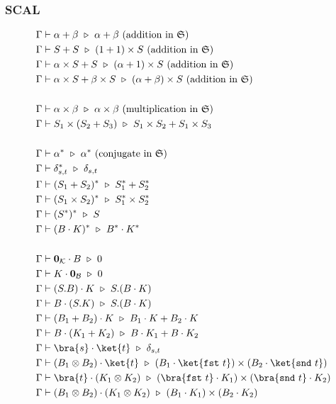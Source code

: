\subsubsection*{\textsf{SCAL}}
\begin{align*}
  & \Gamma \vdash \alpha + \beta \reduce \alpha + \beta\ \textrm{(addition in $\mathfrak{S}$)} \\
  & \Gamma \vdash S + S \reduce (1 + 1) \times S \ \textrm{(addition in $\mathfrak{S}$)} \\
  & \Gamma \vdash \alpha \times S + S \reduce (\alpha + 1) \times S\ \textrm{(addition in $\mathfrak{S}$)} \\
  & \Gamma \vdash \alpha \times S + \beta \times S \reduce (\alpha + \beta) \times S \ \textrm{(addition in $\mathfrak{S}$)} \\
  \\
  & \Gamma \vdash \alpha \times \beta \reduce \alpha \times \beta\ \textrm{(multiplication in $\mathfrak{S}$)} \\
  & \Gamma \vdash S_1 \times (S_2 + S_3) \reduce S_1 \times S_2 + S_1 \times S_3\\
  \\
  & \Gamma \vdash \alpha^* \reduce \alpha^*\ \textrm{(conjugate in $\mathfrak{S}$)} \\
  & \Gamma \vdash \delta_{s, t}^* \reduce \delta_{s, t} \\
  & \Gamma \vdash (S_1 + S_2)^* \reduce S_1^* + S_2^* \\
  & \Gamma \vdash (S_1 \times S_2)^* \reduce S_1^* \times S_2^* \\
  & \Gamma \vdash (S^*)^* \reduce S \\
  & \Gamma \vdash (B \cdot K)^* \reduce B^* \cdot K^* \\
  \\
  & \Gamma \vdash \mathbf{0}_\mathcal{K} \cdot B \reduce 0 \\
  & \Gamma \vdash K \cdot \mathbf{0}_\mathcal{B} \reduce 0 \\
  & \Gamma \vdash (S.B) \cdot K \reduce S.(B \cdot K) \\
  & \Gamma \vdash B \cdot (S.K) \reduce S.(B \cdot K) \\
  & \Gamma \vdash (B_1 + B_2) \cdot K \reduce B_1 \cdot K + B_2 \cdot K \\
  & \Gamma \vdash B \cdot (K_1 + K_2) \reduce B \cdot K_1 + B \cdot K_2 \\
  & \Gamma \vdash \bra{s} \cdot \ket{t} \reduce \delta_{s, t} \\
  & \Gamma \vdash (B_1 \otimes B_2) \cdot \ket{t} \reduce (B_1 \cdot \ket{\fst\ t}) \times (B_2 \cdot \ket{\snd\ t}) \\
  & \Gamma \vdash \bra{t} \cdot (K_1 \otimes K_2) \reduce (\bra{\fst\ t} \cdot K_1) \times (\bra{\snd\ t} \cdot K_2) \\
  & \Gamma \vdash (B_1 \otimes B_2) \cdot (K_1 \otimes K_2) \reduce (B_1 \cdot K_1) \times (B_2 \cdot K_2)
\end{align*}

